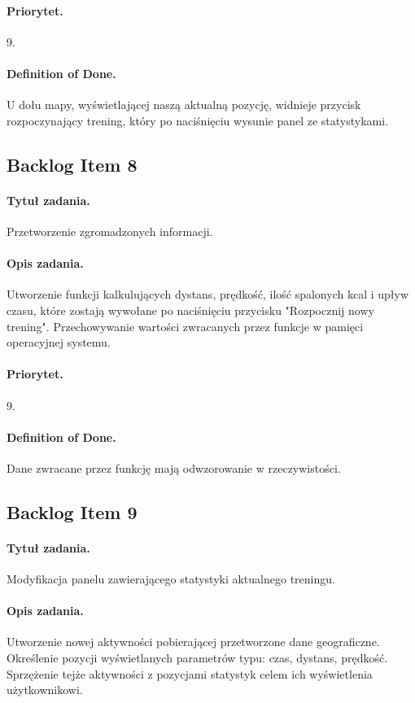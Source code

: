 \documentclass[a4paper]{article}
\begin{document}
\paragraph{Priorytet.} 9.
\paragraph{Definition of Done.} U dołu mapy, wyświetlającej naszą aktualną pozycję, widnieje przycisk rozpoczynający trening, który po naciśnięciu wysunie panel ze statystykami.

\subsection{Backlog Item 8}
\paragraph{Tytuł zadania.} Przetworzenie zgromadzonych informacji.
\paragraph{Opis zadania.} Utworzenie funkcji kalkulujących dystans, prędkość, ilość spalonych kcal i upływ czasu, które zostają wywołane po naciśnięciu przycisku "Rozpocznij nowy trening". Przechowywanie wartości zwracanych przez funkcje w pamięci operacyjnej systemu.
\paragraph{Priorytet.} 9.
\paragraph{Definition of Done.} Dane zwracane przez funkcję mają odwzorowanie w rzeczywistości.

\subsection{Backlog Item 9}
\paragraph{Tytuł zadania.} Modyfikacja panelu zawierającego statystyki aktualnego treningu.
\paragraph{Opis zadania.} Utworzenie nowej aktywności pobierającej przetworzone dane geograficzne. Określenie pozycji wyświetlanych parametrów typu: czas, dystans, prędkość. Sprzężenie tejże aktywności z pozycjami statystyk celem ich wyświetlenia użytkownikowi.
\end{document}
